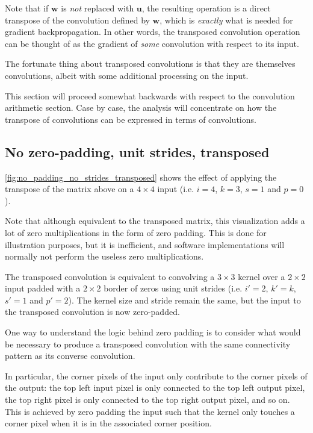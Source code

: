 \documentclass{article}
\begin{document}
Note that if $\mathbf{w}$ is {\em not} replaced with $\mathbf{u}$, the resulting
operation is a direct transpose of the convolution defined by $\mathbf{w}$,
which is {\em exactly} what is needed for gradient backpropagation. In other
words, the transposed convolution operation can be thought of as the gradient of
{\em some} convolution with respect to its input.

The fortunate thing about transposed convolutions is that they are themselves
convolutions, albeit with some additional processing on the input.

This section will proceed somewhat backwards with respect to the convolution
arithmetic section. Case by case, the analysis will concentrate on how the
transpose of convolutions can be expressed in terms of convolutions.

\subsection{No zero-padding, unit strides, transposed}

\autoref{fig:no_padding_no_strides_transposed} shows the effect of applying the
transpose of the matrix above on a $4 \times 4$ input (i.e. $i = 4$, $k = 3$, $s
= 1$ and $p = 0$).

Note that although equivalent to the transposed matrix, this visualization adds
a lot of zero multiplications in the form of zero padding. This is done for
illustration purposes, but it is inefficient, and software implementations will
normally not perform the useless zero multiplications.

The transposed convolution is equivalent to convolving a $3 \times 3$ kernel
over a $2 \times 2$ input padded with a $2 \times 2$ border of zeros using unit
strides (i.e. $i' = 2$, $k' = k$, $s' = 1$ and $p' = 2$). The kernel size and
stride remain the same, but the input to the transposed convolution is now
zero-padded.

One way to understand the logic behind zero padding is to consider what would be
necessary to produce a transposed convolution with the same connectivity pattern
as its converse convolution.

In particular, the corner pixels of the input only contribute to the corner
pixels of the output: the top left input pixel is only connected to the top left
output pixel, the top right pixel is only connected to the top right output
pixel, and so on. This is achieved by zero padding the input such that the
kernel only touches a corner pixel when it is in the associated corner position.
\end{document}
